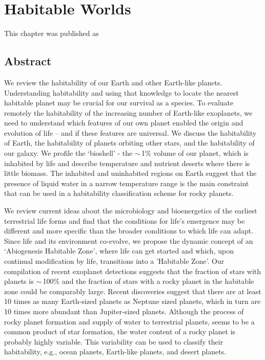 \chapter{Habitable Worlds}\label{ch:HabitableWorlds}
This chapter was published as
\begin{description}
	\item {}
\end{description}
\section*{Abstract}
We review the habitability of our Earth and other Earth-like planets. Understanding habitability and using that knowledge to locate the nearest habitable planet may be crucial for our survival as a species. To evaluate remotely the habitability of the increasing number of Earth-like exoplanets, we need to understand which features of our own planet enabled the origin and evolution of life – and if these features are universal. We discuss the habitability of Earth, the habitability of planets orbiting other stars, and the habitability of our galaxy. We profile the `bioshell' - the $\sim$\,1\% volume of our planet, which is inhabited by life and describe temperature and nutrient deserts where there is little biomass. The inhabited and uninhabited regions on Earth suggest that the presence of liquid water in a narrow temperature range is the main constraint that can be used in a habitability classification scheme for rocky planets.

We review current ideas about the microbiology and bioenergetics of the earliest terrestrial life forms and find that the conditions for life's emergence may be different and more specific than the broader conditions to which life can adapt. Since life and its environment co-evolve, we propose the dynamic concept of an `Abiogenesis Habitable Zone', where life can get started and which, upon continual modification by life, transitions into a 'Habitable Zone'. Our compilation of recent exoplanet detections suggests that the fraction of stars with planets is $\sim$\,100\% and the fraction of stars with a rocky planet in the habitable zone could be comparably large. Recent discoveries suggest that there are at least 10 times as many Earth-sized planets as Neptune sized planets, which in turn are 10 times more abundant than Jupiter-sized planets. Although the process of rocky planet formation and supply of water to terrestrial planets, seems to be a common product of star formation, the water content of a rocky planet is probably highly variable. This variability can be used to classify their habitability, e.g., ocean planets, Earth-like planets, and desert planets.

